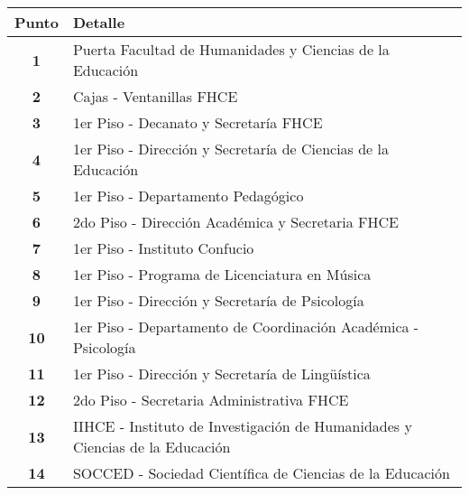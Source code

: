     \begin{longtable}{ c  X }
      \toprule
        \textbf{Punto} &
        \textbf{Detalle}\\

      \midrule
      \endhead

  \textbf{1}
  &
  Puerta Facultad de Humanidades y Ciencias de la Educación
  \\

  \textbf{2}
  &
  Cajas - Ventanillas FHCE
  \\

  \textbf{3}
  &
  1{\tiny er} Piso - Decanato y Secretaría FHCE
  \\

  \textbf{4}
  &
  1{\tiny er} Piso - Dirección y Secretaría de Ciencias de la Educación
  \\


\textbf{5}
&
1{\tiny er} Piso - Departamento Pedagógico
\\

\textbf{6}
&
2{\tiny do} Piso - Dirección Académica y Secretaria FHCE
\\

\textbf{7}
&
1{\tiny er} Piso - Instituto Confucio
\\


\textbf{8}
&
1{\tiny er} Piso - Programa de Licenciatura en Música
\\


\textbf{9}
&
1{\tiny er} Piso - Dirección y Secretaría de Psicología
\\


\textbf{10}
&
1{\tiny er} Piso - Departamento de Coordinación Académica - Psicología
\\


\textbf{11}
&
1{\tiny er} Piso - Dirección y Secretaría de Lingüística
\\


\textbf{12}
&
2{\tiny do} Piso - Secretaria Administrativa FHCE
\\




\textbf{13}
&
IIHCE - Instituto de Investigación de Humanidades y Ciencias de la Educación
\\



\textbf{14}
&
SOCCED - Sociedad Científica de Ciencias de la Educación
\\



\end{longtable}
